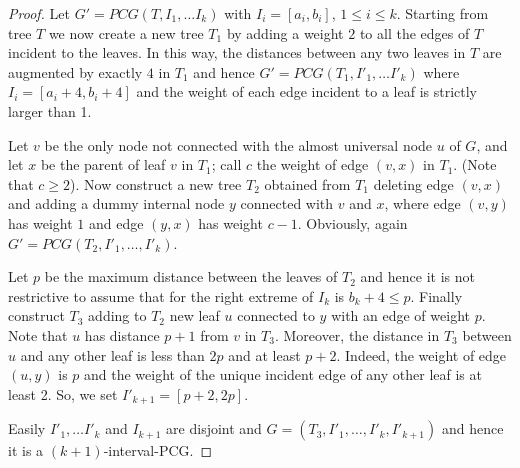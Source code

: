 \documentclass[10pt,a4paper]{amsart}
\newcommand{\Int}[1]{$#1$\textnormal{-interval-PCG}}
\begin{document}
\begin{proof}
Let $G'=PCG(T,I_1,\ldots I_k)$ with $I_i=[a_i, b_i]$, $1\leq i\leq k$.
Starting from tree $T$ we now create a new tree $T_1$ by adding a weight $2$
 to all the edges of $T$ incident to the leaves.
In this way, the distances between any two leaves in $T$ are augmented by exactly $4$ in $T_1$ and hence
$G'=PCG(T_1, I'_1,\ldots I'_k)$ where $I_i=[a_i+4,b_i+4]$ and the weight of each edge incident to a leaf is strictly larger than 1.

Let $v$ be the only node not connected with
the almost universal node $u$ of $G$, and let $x$ be the parent of leaf $v$ in $T_1$; call  $c$ the weight of edge $(v,x)$ in $T_1$. (Note that $c \geq 2$).
Now construct a new tree $T_2$ obtained from $T_1$ deleting edge $(v,x)$ and adding a  dummy internal node $y$ connected with $v$ and $x$, where edge $(v,y)$ has weight $1$ and edge $(y,x)$ has weight $c-1$. Obviously, again $G'=PCG(T_2,I'_1,\ldots,I'_k)$.


%
Let $p$ be the maximum distance between the leaves of $T_2$ and hence it is not restrictive to assume that for the right extreme of $I_k$ is $b_k+4 \leq p$.
Finally construct $T_3$ adding to $T_2$ new leaf $u$ connected to $y$ with an edge of weight $p$.
Note that $u$ has distance $p+1$ from $v$ in $T_3$.
Moreover, the distance in $T_3$ between $u$ and any other leaf is less than $2p$ and at least  $p+2$.
Indeed, the weight of edge $(u,y)$ is $p$ and the weight of the unique incident edge of any other leaf is at least 2.
So, we set $I'_{k+1}=[p+2,2p]$.

Easily $I'_1, \ldots I'_k$ and $I_{k+1}$ are disjoint and $G=(T_3,I'_1,\ldots,I'_k,I'_{k+1})$ and hence it is a \Int{(k+1)}.
\end{proof}
\end{document}
